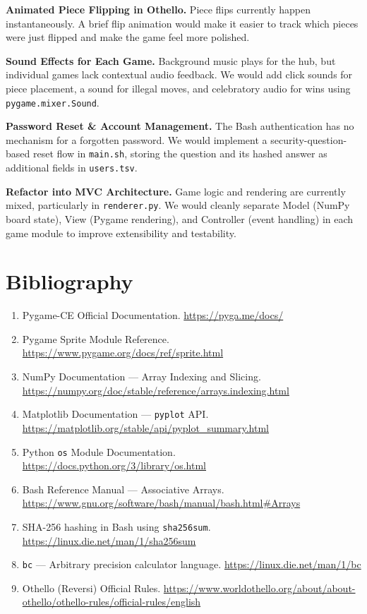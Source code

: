 \documentclass[12pt,a4paper]{article}
\begin{document}
\textbf{Animated Piece Flipping in Othello.} Piece flips currently happen instantaneously. A brief flip animation would make it easier to track which pieces were just flipped and make the game feel more polished.

\textbf{Sound Effects for Each Game.} Background music plays for the hub, but individual games lack contextual audio feedback. We would add click sounds for piece placement, a sound for illegal moves, and celebratory audio for wins using \texttt{pygame.mixer.Sound}.

\textbf{Password Reset \& Account Management.} The Bash authentication has no mechanism for a forgotten password. We would implement a security-question-based reset flow in \texttt{main.sh}, storing the question and its hashed answer as additional fields in \texttt{users.tsv}.

\textbf{Refactor into MVC Architecture.} Game logic and rendering are currently mixed, particularly in \texttt{renderer.py}. We would cleanly separate Model (NumPy board state), View (Pygame rendering), and Controller (event handling) in each game module to improve extensibility and testability.

\newpage

\section{Bibliography}

\begin{enumerate}
    \item Pygame-CE Official Documentation. \url{https://pyga.me/docs/}
    \item Pygame Sprite Module Reference. \url{https://www.pygame.org/docs/ref/sprite.html}
    \item NumPy Documentation --- Array Indexing and Slicing. \url{https://numpy.org/doc/stable/reference/arrays.indexing.html}
    \item Matplotlib Documentation --- \texttt{pyplot} API. \url{https://matplotlib.org/stable/api/pyplot_summary.html}
    \item Python \texttt{os} Module Documentation. \url{https://docs.python.org/3/library/os.html}
    \item Bash Reference Manual --- Associative Arrays. \url{https://www.gnu.org/software/bash/manual/bash.html\#Arrays}
    \item SHA-256 hashing in Bash using \texttt{sha256sum}. \url{https://linux.die.net/man/1/sha256sum}
    \item \texttt{bc} --- Arbitrary precision calculator language. \url{https://linux.die.net/man/1/bc}
    \item Othello (Reversi) Official Rules. \url{https://www.worldothello.org/about/about-othello/othello-rules/official-rules/english}
\end{enumerate}
\end{document}
